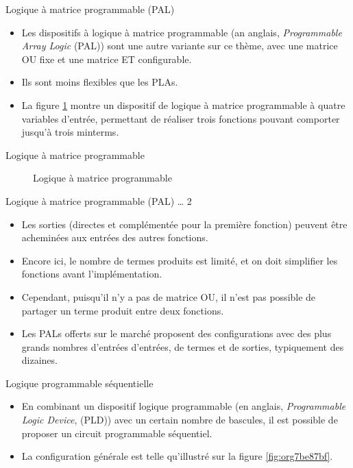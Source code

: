 \documentclass[presentation]{beamer}
\begin{document}
\begin{frame}[label={sec:org0671f17}]{Logique à matrice programmable (PAL)}
\begin{itemize}
\item Les dispositifs à \alert{logique à matrice programmable} (an anglais, \emph{Programmable Array Logic} (PAL)) sont une autre variante sur ce thème, avec une matrice OU fixe et une matrice ET configurable.

\item Ils sont moins flexibles que les PLAs.

\item La figure \ref{fig:orgfae8149} montre un dispositif de logique à matrice programmable à quatre variables d'entrée, permettant de réaliser trois fonctions pouvant comporter jusqu'à trois minterms.
\end{itemize}
\end{frame}

\begin{frame}[label={sec:orgcb40d17}]{Logique à matrice programmable}
\begin{figure}[htbp]
\centering

\caption{\label{fig:orgfae8149}Logique à matrice programmable}
\end{figure}
\end{frame}

\begin{frame}[label={sec:orgc99058f}]{Logique à matrice programmable (PAL) \ldots{} 2}
\begin{itemize}
\item Les sorties (directes et complémentée pour la première fonction) peuvent être acheminées aux entrées des autres fonctions.

\item Encore ici, le nombre de termes produits est limité, et on doit simplifier les fonctions avant l'implémentation.

\item Cependant, puisqu'il n'y a pas de matrice OU, il n'est pas possible de partager un terme produit entre deux fonctions.

\item Les PALs offerts sur le marché proposent des configurations avec des plus grands nombres d'entrées d'entrées, de termes et de sorties, typiquement des dizaines.
\end{itemize}
\end{frame}

\begin{frame}[label={sec:org1415c3e}]{Logique programmable séquentielle}
\begin{itemize}
\item En combinant un dispositif logique programmable (en anglais, \emph{Programmable Logic Device}, (PLD)) avec un certain nombre de bascules, il est possible de proposer un circuit programmable séquentiel.

\item La configuration générale est telle qu'illustré sur la figure \ref{fig:org7be87bf}.
\end{itemize}
\end{frame}
\end{document}
